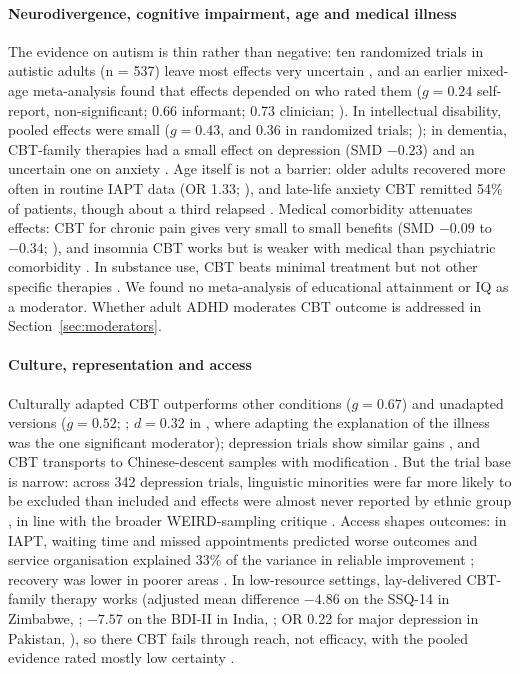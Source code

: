 \paragraph{Neurodivergence, cognitive impairment, age and medical illness} The evidence on autism is thin rather than negative: ten randomized trials in autistic adults (n = 537) leave most effects very uncertain \citep{perezcastilla2026autistic}, and an earlier mixed-age meta-analysis found that effects depended on who rated them ($g=0.24$ self-report, non-significant; 0.66 informant; 0.73 clinician; \citealp{weston2016autism}).
In intellectual disability, pooled effects were small ($g=0.43$, and 0.36 in randomized trials; \citealp{tapp2023id}); in dementia, CBT-family therapies had a small effect on depression (SMD $-0.23$) and an uncertain one on anxiety \citep{orgeta2022dementia}.
Age itself is not a barrier: older adults recovered more often in routine IAPT data (OR 1.33; \citealp{saunders2021older}), and late-life anxiety CBT remitted 54\% of patients, though about a third relapsed \citep{johnco2026olderanxiety}.
Medical comorbidity attenuates effects: CBT for chronic pain gives very small to small benefits (SMD $-0.09$ to $-0.34$; \citealp{williams2020chronicpain}), and insomnia CBT works but is weaker with medical than psychiatric comorbidity \citep{wu2015cbtimedical}.
In substance use, CBT beats minimal treatment but not other specific therapies \citep{magill2019cbtsud}.
We found no meta-analysis of educational attainment or IQ as a moderator.
Whether adult ADHD moderates CBT outcome is addressed in Section~\ref{sec:moderators}.

\paragraph{Culture, representation and access} Culturally adapted CBT outperforms other conditions ($g=0.67$) and unadapted versions ($g=0.52$; \citealp{hall2016culturalmeta}; $d=0.32$ in \citealp{benish2011myth}, where adapting the explanation of the illness was the one significant moderator); depression trials show similar gains \citep{anik2021culturaldepression}, and CBT transports to Chinese-descent samples with modification \citep{li2023chinese}.
But the trial base is narrow: across 342 depression trials, linguistic minorities were far more likely to be excluded than included and effects were almost never reported by ethnic group \citep{polo2019diversity}, in line with the broader WEIRD-sampling critique \citep{henrich2010weird}.
Access shapes outcomes: in IAPT, waiting time and missed appointments predicted worse outcomes and service organisation explained 33\% of the variance in reliable improvement \citep{Clark2018IAPT}; recovery was lower in poorer areas \citep{delgadillo2016poverty}.
In low-resource settings, lay-delivered CBT-family therapy works (adjusted mean difference $-4.86$ on the SSQ-14 in Zimbabwe, \citealp{chibanda2016friendship}; $-7.57$ on the BDI-II in India, \citealp{patel2017hap}; OR 0.22 for major depression in Pakistan, \citealp{rahman2008pakistan}), so there CBT fails through reach, not efficacy, with the pooled evidence rated mostly low certainty \citep{vanginneken2021primary,barbui2020lmicumbrella}.

